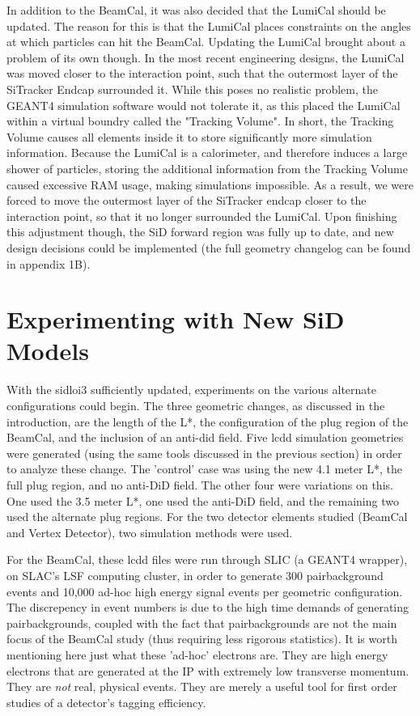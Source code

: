 \documentclass{report}
\begin{document}
            In addition to the BeamCal, it was also decided that the LumiCal should be updated. The reason for this is that the LumiCal places constraints on the angles at which particles can hit the BeamCal. Updating the LumiCal brought about a problem of its own though. In the most recent engineering designs, the LumiCal was moved closer to the interaction point, such that the outermost layer of the SiTracker Endcap surrounded it. While this poses no realistic problem, the GEANT4 simulation software would not tolerate it, as this placed the LumiCal within a virtual boundry called the "Tracking Volume". In short, the Tracking Volume causes all elements inside it to store significantly more simulation information. Because the LumiCal is a calorimeter, and therefore induces a large shower of particles, storing the additional information from the Tracking Volume caused excessive RAM usage, making simulations impossible. As a result, we were forced to move the outermost layer of the SiTracker endcap closer to the interaction point, so that it no longer surrounded the LumiCal. Upon finishing this adjustment though, the SiD forward region was fully up to date, and new design decisions could be implemented (the full geometry changelog can be found in appendix 1B).


        \section{Experimenting with New SiD Models}

            With the sidloi3 sufficiently updated, experiments on the various alternate configurations could begin. The three geometric changes, as discussed in the introduction, are the length of the L*, the configuration of the plug region of the BeamCal, and the inclusion of an anti-did field. Five lcdd simulation geometries were generated (using the same tools discussed in the previous section) in order to analyze these change. The 'control' case was using the new 4.1 meter L*, the full plug region, and no anti-DiD field. The other four were variations on this. One used the 3.5 meter L*, one used the anti-DiD field, and the remaining two used the alternate plug regions. For the two detector elements studied (BeamCal and Vertex Detector), two simulation methods were used. 

            For the BeamCal, these lcdd files were run through SLIC (a GEANT4 wrapper), on SLAC's LSF computing cluster, in order to generate 300 pairbackground events and 10,000 ad-hoc high energy signal events per geometric configuration. The discrepency in event numbers is due to the high time demands of generating pairbackgrounds, coupled with the fact that pairbackgrounds are not the main focus of the BeamCal study (thus requiring less rigorous statistics). It is worth mentioning here just what these 'ad-hoc' electrons are. They are high energy electrons that are generated at the IP with extremely low transverse momentum. They are \textit{not} real, physical events. They are merely a useful tool for first order studies of a detector's tagging efficiency.
\end{document}
